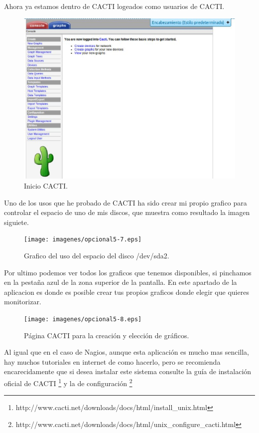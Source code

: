 Ahora ya estamos dentro de CACTI logeados como usuarios de CACTI.


\begin{figure}[H]
\begin{center}
\includegraphics[scale=0.4]{imagenes/opcional5-5.eps}
\caption{Inicio CACTI.}
\end{center}
\end{figure}

Uno de los usos que he probado de CACTI ha sido crear mi propio grafico para controlar el espacio de uno de mis discos, que muestra como resultado la imagen siguiete.

\begin{figure}[H]
\begin{center}
\texttt{[image: imagenes/opcional5-7.eps]}
\caption{Grafico del uso del espacio del disco /dev/sda2.}
\end{center}
\end{figure}

Por ultimo podemos ver todos los graficos que tenemos disponibles, si pinchamos en la pestaña azul de la zona superior de la pantalla. En este apartado de la aplicacion es donde es posible crear tus propios graficos donde elegir que quieres monitorizar.

\begin{figure}[H]
\begin{center}
\texttt{[image: imagenes/opcional5-8.eps]}
\caption{Página CACTI para la creación y elección de gráficos.}
\end{center}
\end{figure}

Al igual que en el caso de Nagios, aunque esta aplicación es mucho mas sencilla, hay muchos tutoriales en internet de como hacerlo, pero se recomienda encarecidamente que si desea instalar este sistema consulte la guía de instalación oficial de CACTI \footnote{http://www.cacti.net/downloads/docs/html/install\_unix.html} y la de configuración \footnote{http://www.cacti.net/downloads/docs/html/unix\_configure\_cacti.html}

